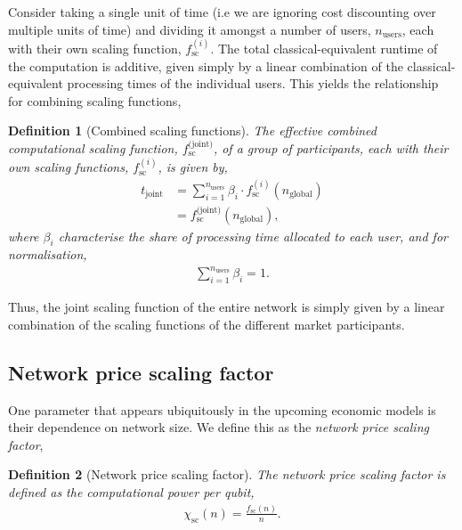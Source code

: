 \documentclass[aps, rmp, twocolumn, amsmath, amssymb, nofootinbib, superscriptaddress, longbibliography, floatfix, table-of-contents, eqsecnum]{revtex4-1}
\newtheorem{definition}{Definition}
\begin{document}
Consider taking a single unit of time (i.e we are ignoring cost discounting over multiple units of time) and dividing it amongst a number of users, $n_\text{users}$, each with their own scaling function, $f_\text{sc}^{(i)}$. The total classical-equivalent runtime of the computation is additive, given simply by a linear combination of the classical-equivalent processing times of the individual users. This yields the relationship for combining scaling functions,
\begin{definition}[Combined scaling functions]\label{def:comb_sc_func}
The effective combined computational scaling function, $f_\text{sc}^\text{(joint)}$, of a group of participants, each with their own scaling functions, $f_\text{sc}^{(i)}$, is given by,
\begin{align}
	t_\text{joint} &= \sum_{i=1}^{n_{\text{users}}} \beta_i \cdot f_\text{sc}^{(i)}(n_\text{global}) \nonumber \\
	&= f_\text{sc}^\text{(joint)}(n_\text{global}),
\end{align}
where $\beta_i$ characterise the share of processing time allocated to each user, and for normalisation,
\begin{align}
\sum_{i=1}^{n_\text{users}} \beta_i = 1.
\end{align}

\end{definition}

Thus, the joint scaling function of the entire network is simply given by a linear combination of the scaling functions of the different market participants.

%
%

\subsection{Network price scaling factor}

One parameter that appears ubiquitously in the upcoming economic models is their dependence on network size. We define this as the \textit{network price scaling factor},

\begin{definition}[Network price scaling factor]\label{def:NPSF}
The network price scaling factor is defined as the computational power per qubit,
\begin{align}
\chi_\text{sc}(n) = \frac{f_\text{sc}(n)}{n}.
\end{align}
\end{definition}
\end{document}
